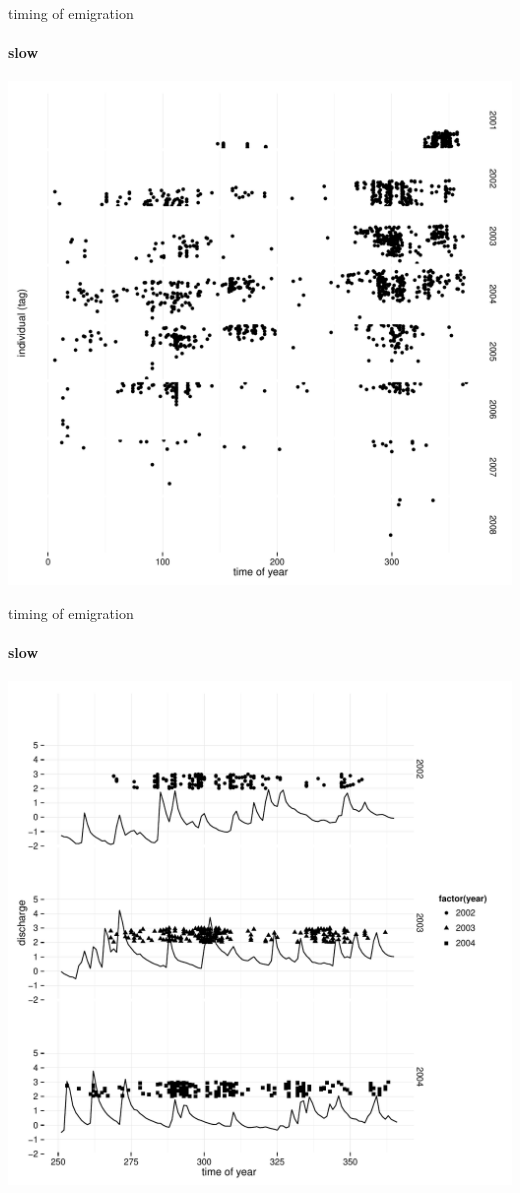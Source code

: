 \documentclass[show notes]{beamer}
\begin{document}
\begin{frame}{timing of emigration}
  \framesubtitle{slow}	
  \includegraphics[clip, trim=0 0 0 0, height=.8\textheight]{emigrant-timing.pdf}
    
\end{frame}

\begin{frame}{timing of emigration}
  \framesubtitle{slow}	
  \includegraphics[clip, trim=0 0 0 0, height=.8\textheight]{emigrant-fast-events.pdf}
    
\end{frame}
\end{document}
